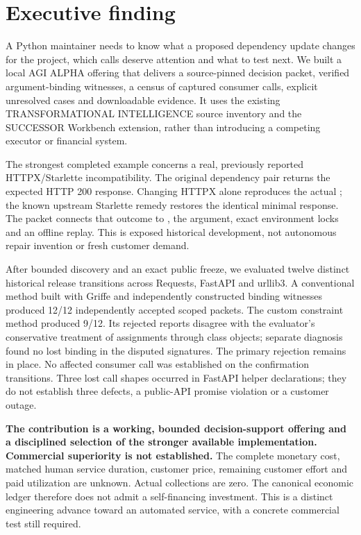 \documentclass[11pt,letterpaper]{article}
\newcommand{\pathcode}[1]{{\small\ttfamily\detokenize{#1}}}
\newcommand{\ConvAccepted}{12}
\newcommand{\CustomAccepted}{9}
\begin{document}
\section*{Executive finding}
A Python maintainer needs to know what a proposed dependency update changes for the project, which calls deserve attention and what to test next. We built a local AGI ALPHA offering that delivers a source-pinned decision packet, verified argument-binding witnesses, a census of captured consumer calls, explicit unresolved cases and downloadable evidence. It uses the existing TRANSFORMATIONAL INTELLIGENCE source inventory and the SUCCESSOR Workbench extension, rather than introducing a competing executor or financial system.

The strongest completed example concerns a real, previously reported HTTPX/Starlette incompatibility. The original dependency pair returns the expected HTTP 200 response. Changing HTTPX alone reproduces the actual \pathcode{TypeError}; the known upstream Starlette remedy restores the identical minimal response. The packet connects that outcome to \pathcode{starlette/testclient.py:429}, the \pathcode{app} argument, exact environment locks and an offline replay. This is exposed historical development, not autonomous repair invention or fresh customer demand.

After bounded discovery and an exact public freeze, we evaluated twelve distinct historical release transitions across Requests, FastAPI and urllib3. A conventional method built with Griffe and independently constructed binding witnesses produced \ConvAccepted/12 independently accepted scoped packets. The custom constraint method produced \CustomAccepted/12. Its rejected reports disagree with the evaluator's conservative treatment of assignments through class objects; separate diagnosis found no lost binding in the disputed signatures. The primary rejection remains in place. No affected consumer call was established on the confirmation transitions. Three lost call shapes occurred in FastAPI helper declarations; they do not establish three defects, a public-API promise violation or a customer outage.

\textbf{The contribution is a working, bounded decision-support offering and a disciplined selection of the stronger available implementation. Commercial superiority is not established.} The complete monetary cost, matched human service duration, customer price, remaining customer effort and paid utilization are unknown. Actual collections are zero. The canonical economic ledger therefore does not admit a self-financing investment. This is a distinct engineering advance toward an automated service, with a concrete commercial test still required.
\end{document}
